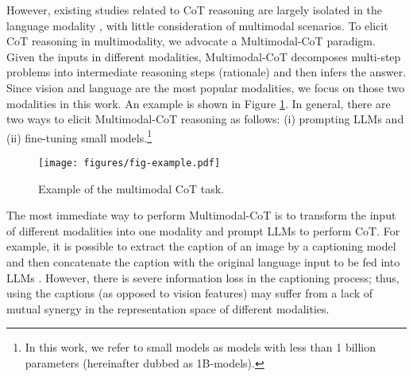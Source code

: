 \documentclass[nohyperref]{article}
\theoremstyle{plain}
\theoremstyle{definition}
\theoremstyle{remark}
\begin{document}
However, existing studies related to CoT reasoning are largely isolated in the language modality \citep{wang2022rationale,zhou2022least,lu2022dynamic,fu2022complexity}, with little consideration of multimodal scenarios. To elicit CoT reasoning in multimodality, we advocate a Multimodal-CoT paradigm. Given the inputs in different modalities, Multimodal-CoT decomposes multi-step problems into intermediate reasoning steps (rationale) and then infers the answer. Since vision and language are the most popular modalities, we focus on those two modalities in this work. An example is shown in Figure \ref{fig_examples}. In general, there are two ways to elicit Multimodal-CoT reasoning as follows: (i) prompting LLMs and (ii) fine-tuning small models.\footnote{In this work, we refer to small models as models with less than 1 billion parameters (hereinafter dubbed as 1B-models).}

\begin{figure}[t]
  \begin{center}
   \texttt{[image: figures/fig-example.pdf]}
  \end{center}
  \vspace{-3.6mm}
  \caption{Example of the multimodal CoT task.}
    \vspace{-7mm}
  \label{fig_examples}
\end{figure}


The most immediate way to perform Multimodal-CoT is to transform the input of different modalities into one modality and prompt LLMs to perform CoT. {For example}, it is possible to extract the caption of an image by a captioning model and then concatenate the caption with the original language input to be fed into LLMs \citep{lu2022learn}. However, {there is severe information loss in the captioning process; thus, using the captions (as opposed to vision features) may suffer from a lack of mutual synergy in the representation space of different modalities.}
\end{document}
